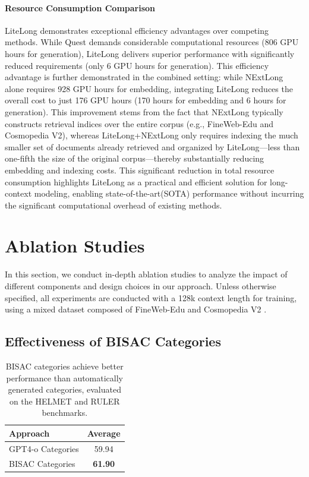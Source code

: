 \documentclass{article}
\theoremstyle{plain}
\theoremstyle{definition}
\theoremstyle{remark}
\begin{document}
    \paragraph{Resource Consumption Comparison}
    LiteLong demonstrates exceptional efficiency advantages over competing methods. While Quest demands considerable computational resources (806 GPU hours for generation), LiteLong delivers superior performance with significantly reduced requirements (only 6 GPU hours for generation). This efficiency advantage is further demonstrated in the combined setting: while NExtLong alone requires 928 GPU hours for embedding, integrating LiteLong reduces the overall cost to just 176 GPU hours (170 hours for embedding and 6 hours for generation). This improvement stems from the fact that NExtLong typically constructs retrieval indices over the entire corpus (e.g., FineWeb-Edu and Cosmopedia V2), whereas LiteLong+NExtLong only requires indexing the much smaller set of documents already retrieved and organized by LiteLong—less than one-fifth the size of the original corpus—thereby substantially reducing embedding and indexing costs. This significant reduction in total resource consumption highlights LiteLong as a practical and efficient solution for long-context modeling, enabling state-of-the-art(SOTA) performance without incurring the significant computational overhead of existing methods.

\section{Ablation Studies}

    In this section, we conduct in-depth ablation studies to analyze the impact of different components and design choices in our approach. Unless otherwise specified, all experiments are conducted with a 128k context length for training, using a mixed dataset composed of FineWeb-Edu \cite{lozhkov2024finewebedu} and Cosmopedia V2 \cite{benallal2024smollmcorpus}.

    \subsection{Effectiveness of BISAC Categories}

    \begin{table}[!tbp]
        \centering
        \small
        \begin{tabular}{lc}
        \toprule
        \textbf{Approach} & \textbf{Average} \\
        \midrule
        GPT4-o Categories & 59.94 \\
        BISAC Categories & \textbf{61.90} \\
        \bottomrule
        \end{tabular}
        \caption{BISAC categories achieve better performance than automatically generated categories, evaluated on the HELMET and RULER benchmarks.}
        \label{tab:bisac_effect}
    \end{table}
\end{document}
